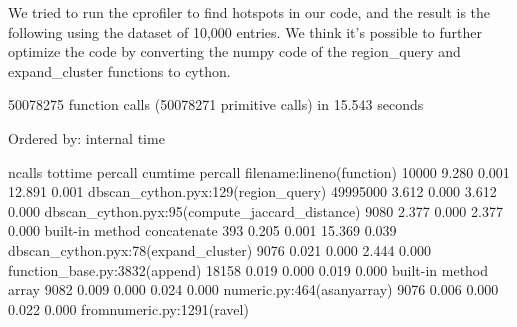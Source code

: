 \documentclass{article}
\begin{document}
We tried to run the cprofiler to find hotspots in our code, and the result is the following using the dataset of 10,000 entries.
We think it's possible to further optimize the code by converting the numpy code of the region\_query and expand\_cluster functions to cython.
\begin{pythonOutput}
        50078275 function calls (50078271 primitive calls) in 15.543 seconds

   Ordered by: internal time

   ncalls  tottime  percall  cumtime  percall filename:lineno(function)
    10000    9.280    0.001   12.891    0.001 dbscan_cython.pyx:129(region_query)
 49995000    3.612    0.000    3.612    0.000 dbscan_cython.pyx:95(compute_jaccard_distance)
     9080    2.377    0.000    2.377    0.000 {built-in method concatenate}
      393    0.205    0.001   15.369    0.039 dbscan_cython.pyx:78(expand_cluster)
     9076    0.021    0.000    2.444    0.000 function_base.py:3832(append)
    18158    0.019    0.000    0.019    0.000 {built-in method array}
     9082    0.009    0.000    0.024    0.000 numeric.py:464(asanyarray)
     9076    0.006    0.000    0.022    0.000 fromnumeric.py:1291(ravel)

\end{pythonOutput}
\end{document}
